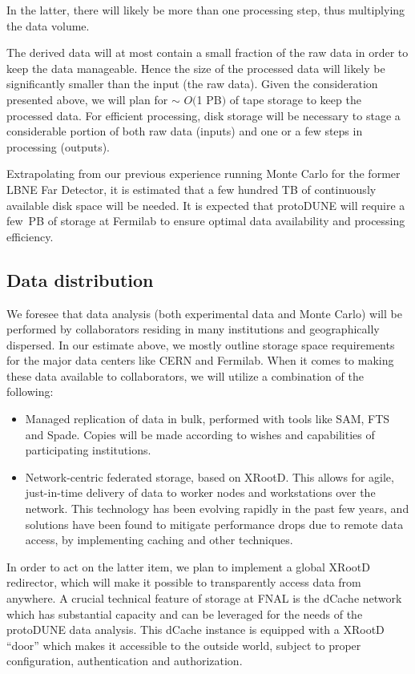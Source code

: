 In the latter, there will likely be more than one processing step, thus multiplying the data volume. 

The derived data will at most contain a small fraction of the raw data in order to keep the data manageable.
Hence the size of the processed data will likely be significantly smaller than the input (the raw data). 
Given the consideration presented above, we will plan for
$\sim$ $O($1 PB$)$ of tape storage to keep the processed data. 
For efficient processing, disk storage will be necessary
to stage a considerable portion of both raw data (inputs) and one or a few steps in processing (outputs).

Extrapolating from our previous experience running Monte Carlo for the former LBNE Far Detector, it is estimated
that  a few hundred TB of continuously available disk space will be needed. It is expected that protoDUNE will require
a few~PB of storage at Fermilab to ensure optimal data availability and  processing efficiency. 

\subsection{Data distribution}
We foresee that data analysis (both experimental data and Monte Carlo) will be performed by collaborators residing in many 
institutions and geographically dispersed. In our
estimate above, we mostly outline storage space requirements for the
major data centers like CERN and Fermilab. When it comes to making these data available to collaborators, we will utilize a combination of the following:
\begin{itemize}
\item Managed replication of data in bulk, performed with tools like SAM, FTS and Spade. Copies will be made according to wishes and capabilities of participating institutions.
\item Network-centric federated storage, based on XRootD. This allows for agile, just-in-time delivery of data to worker nodes and workstations over the network. This
technology has been evolving rapidly in the past few years, and solutions have been found to mitigate performance drops due to remote data access, by implementing caching and other techniques.
\end{itemize}

\noindent In order to act on the latter item, we plan to implement a global XRootD redirector, which will make it possible to transparently access data from anywhere.
A crucial technical feature of storage at FNAL is the dCache network which has substantial capacity and can be leveraged
for the needs of the protoDUNE data analysis. This dCache instance is equipped with a XRootD ``door'' which makes it accessible to the outside world, subject
to proper configuration, authentication and authorization.


